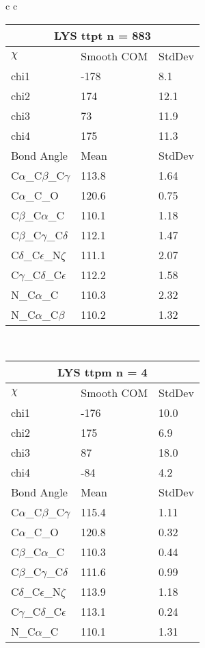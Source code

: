 \begin{longtable}{ c c }
  \begin{tabular}{ l l l }
  \toprule
  \multicolumn{3}{c}{LYS \textbf{ttpt} n = 883} \\ \toprule
  $\chi$       & Smooth COM & StdDev \\ \midrule
  chi1 & -178 & 8.1 \\ 
  chi2 & 174 & 12.1 \\ 
  chi3 & 73 & 11.9 \\ 
  chi4 & 175 & 11.3 \\ \midrule
  Bond Angle   & Mean     & StdDev \\ \midrule
  C$\alpha$\_C$\beta$\_C$\gamma$ & 113.8 & 1.64\\
  C$\alpha$\_C\_O & 120.6 & 0.75\\
  C$\beta$\_C$\alpha$\_C & 110.1 & 1.18\\
  C$\beta$\_C$\gamma$\_C$\delta$ & 112.1 & 1.47\\
  C$\delta$\_C$\epsilon$\_N$\zeta$ & 111.1 & 2.07\\
  C$\gamma$\_C$\delta$\_C$\epsilon$ & 112.2 & 1.58\\
  N\_C$\alpha$\_C & 110.3 & 2.32\\
  N\_C$\alpha$\_C$\beta$ & 110.2 & 1.32\\
  \bottomrule
  \end{tabular}
  \\
  \begin{tabular}{ l l l }
  \toprule
  \multicolumn{3}{c}{LYS \textbf{ttpm} n = 4} \\ \toprule
  $\chi$       & Smooth COM & StdDev \\ \midrule
  chi1 & -176 & 10.0 \\ 
  chi2 & 175 & 6.9 \\ 
  chi3 & 87 & 18.0 \\ 
  chi4 & -84 & 4.2 \\ \midrule
  Bond Angle   & Mean     & StdDev \\ \midrule
  C$\alpha$\_C$\beta$\_C$\gamma$ & 115.4 & 1.11\\
  C$\alpha$\_C\_O & 120.8 & 0.32\\
  C$\beta$\_C$\alpha$\_C & 110.3 & 0.44\\
  C$\beta$\_C$\gamma$\_C$\delta$ & 111.6 & 0.99\\
  C$\delta$\_C$\epsilon$\_N$\zeta$ & 113.9 & 1.18\\
  C$\gamma$\_C$\delta$\_C$\epsilon$ & 113.1 & 0.24\\
  N\_C$\alpha$\_C & 110.1 & 1.31\\

\end{tabular}
\end{longtable}
